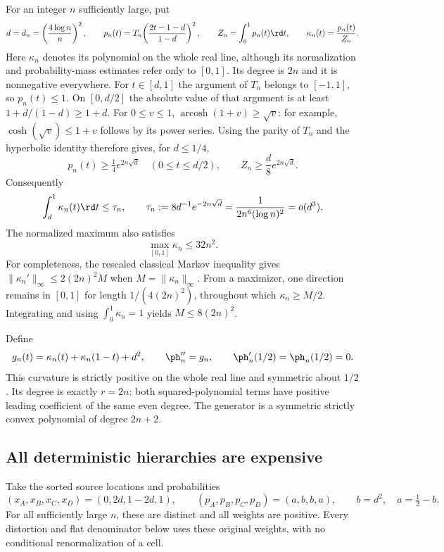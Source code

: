 For an integer $n$ sufficiently large, put
\begin{equation}
 d=d_n=\left(\frac{4\log n}{n}\right)^2,\qquad
 p_n(t)=T_n\!\left(\frac{2t-1-d}{1-d}\right)^2,\qquad
 Z_n=\int_0^1p_n(t)\rd t,\qquad
 \kappa_n(t)=\frac{p_n(t)}{Z_n}.
 \label{eq:ext-endpointneedle}
\end{equation}
Here $\kappa_n$ denotes its polynomial on the whole real line, although its
normalization and probability-mass estimates refer only to $[0,1]$.
Its degree is $2n$ and it is nonnegative everywhere. For $t\in[d,1]$ the
argument of $T_n$ belongs to $[-1,1]$, so $p_n(t)\le1$. On $[0,d/2]$ the
absolute value of that argument is at least $1+d/(1-d)\ge1+d$.
For $0\le v\le1$, $\operatorname{arcosh}(1+v)\ge\sqrt v$: for example,
$\cosh(\sqrt v)\le1+v$ follows by its power series. Using the parity of
$T_n$ and the hyperbolic identity therefore gives, for $d\le1/4$,
\[
 p_n(t)\ge\tfrac14e^{2n\sqrt d}\quad(0\le t\le d/2),\qquad
 Z_n\ge\frac d8 e^{2n\sqrt d}.
\]
Consequently
\begin{equation}
 \int_d^1\kappa_n(t)\rd t\le\tau_n,
 \qquad
 \tau_n:=8d^{-1}e^{-2n\sqrt d}
       =\frac{1}{2n^6(\log n)^2}=o(d^3).
 \label{eq:ext-tail}
\end{equation}
The normalized maximum also satisfies
\begin{equation}
 \max_{[0,1]}\kappa_n\le32n^2.
 \label{eq:ext-max}
\end{equation}
For completeness, the rescaled classical Markov inequality
\cite{shadrin} gives $\|\kappa_n'\|_\infty\le2(2n)^2M$ when
$M=\|\kappa_n\|_\infty$. From a maximizer, one direction remains in $[0,1]$
for length $1/(4(2n)^2)$, throughout which $\kappa_n\ge M/2$.
Integrating and using $\int_0^1\kappa_n=1$ yields $M\le8(2n)^2$.

Define
\begin{equation}
 g_n(t)=\kappa_n(t)+\kappa_n(1-t)+d^2,
 \qquad \ph_n''=g_n,
 \qquad \ph_n'(1/2)=\ph_n(1/2)=0.
 \label{eq:ext-curvature}
\end{equation}
This curvature is strictly positive on the whole real line and symmetric
about $1/2$. Its degree is exactly $r=2n$: both squared-polynomial terms
have positive leading coefficient of the same even degree. The generator
is a symmetric strictly convex polynomial of degree $2n+2$.

\subsection{All deterministic hierarchies are expensive}
Take the sorted source locations and probabilities
\begin{equation}
 (x_A,x_B,x_C,x_D)=(0,2d,1-2d,1),\qquad
 (p_A,p_B,p_C,p_D)=(a,b,b,a),\qquad
 b=d^2,\quad a=\tfrac12-b.
 \label{eq:ext-source}
\end{equation}
For all sufficiently large $n$, these are distinct and all weights are
positive. Every distortion and flat denominator below uses these original
weights, with no conditional renormalization of a cell.

